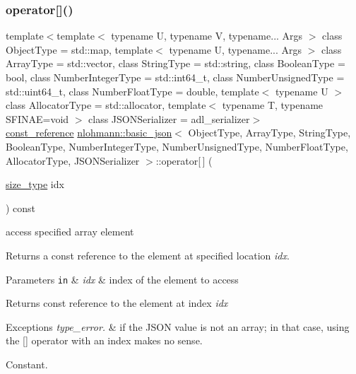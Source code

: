 \subsubsection{\texorpdfstring{operator[]()}{operator[]()}\hspace{0.1cm}{\footnotesize\ttfamily [2/8]}}
{\footnotesize\ttfamily template$<$template$<$ typename U, typename V, typename... Args $>$ class Object\+Type = std\+::map, template$<$ typename U, typename... Args $>$ class Array\+Type = std\+::vector, class String\+Type  = std\+::string, class Boolean\+Type  = bool, class Number\+Integer\+Type  = std\+::int64\+\_\+t, class Number\+Unsigned\+Type  = std\+::uint64\+\_\+t, class Number\+Float\+Type  = double, template$<$ typename U $>$ class Allocator\+Type = std\+::allocator, template$<$ typename T, typename S\+F\+I\+N\+A\+E=void $>$ class J\+S\+O\+N\+Serializer = adl\+\_\+serializer$>$ \\
\mbox{\hyperlink{classnlohmann_1_1basic__json_a4057c5425f4faacfe39a8046871786ca}{const\+\_\+reference}} \mbox{\hyperlink{classnlohmann_1_1basic__json}{nlohmann\+::basic\+\_\+json}}$<$ Object\+Type, Array\+Type, String\+Type, Boolean\+Type, Number\+Integer\+Type, Number\+Unsigned\+Type, Number\+Float\+Type, Allocator\+Type, J\+S\+O\+N\+Serializer $>$\+::operator\mbox{[}$\,$\mbox{]} (\begin{DoxyParamCaption}\item[{\mbox{\hyperlink{classnlohmann_1_1basic__json_a39f2cd0b58106097e0e67bf185cc519b}{size\+\_\+type}}}]{idx }\end{DoxyParamCaption}) const\hspace{0.3cm}{\ttfamily [inline]}}



access specified array element 

Returns a const reference to the element at specified location {\itshape idx}.


\begin{DoxyParams}[1]{Parameters}
\mbox{\tt in}  & {\em idx} & index of the element to access\\
\hline
\end{DoxyParams}
\begin{DoxyReturn}{Returns}
const reference to the element at index {\itshape idx} 
\end{DoxyReturn}

\begin{DoxyExceptions}{Exceptions}
{\em type\+\_\+error.} & if the J\+S\+ON value is not an array; in that case, using the \mbox{[}\mbox{]} operator with an index makes no sense.\\
\hline
\end{DoxyExceptions}
Constant.

